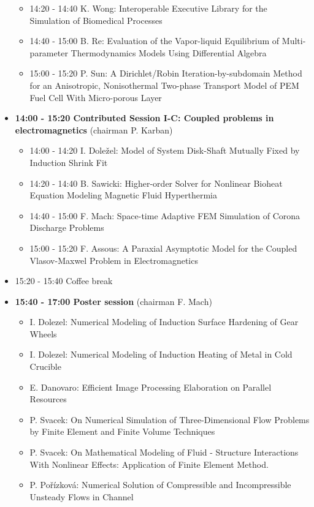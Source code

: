 \documentclass[10pt, A4]{article}%
\begin{document}
\begin{itemize}
\begin{itemize}
    \item 14:20 - 14:40 {K. Wong}: {Interoperable Executive Library for the Simulation of Biomedical Processes}
    \item 14:40 - 15:00 {B. Re}: {Evaluation of the Vapor-liquid Equilibrium of Multi-parameter Thermodynamics Models Using Differential Algebra}
    \item 15:00 - 15:20 {P. Sun}: A Dirichlet/Robin Iteration-by-subdomain Method for an Anisotropic, Nonisothermal Two-phase Transport Model of PEM Fuel Cell With Micro-porous Layer
  \end{itemize}
    \item {\bf 14:00 - 15:20 Contributed Session I-C: Coupled problems in electromagnetics} (chairman P. Karban) 
  \begin{itemize}
    \item 14:00 - 14:20 {I. Doležel}: {Model of System Disk-Shaft Mutually Fixed by Induction Shrink Fit}
    \item 14:20 - 14:40 {B. Sawicki}: {Higher-order Solver for Nonlinear Bioheat Equation Modeling Magnetic Fluid Hyperthermia}
    \item 14:40 - 15:00 {F. Mach}: {Space-time Adaptive FEM Simulation of Corona Discharge Problems}
    \item 15:00 - 15:20 {F. Assous}: {A Paraxial Asymptotic Model for the Coupled Vlasov-Maxwel Problem in Electromagnetics}  %
    \end{itemize}
  \item 15:20 - 15:40 Coffee break
  \newpage
  \item {\bf 15:40 - 17:00 Poster session} (chairman F. Mach)
  \begin{itemize}
    \item {I. Dolezel}: {Numerical Modeling of Induction Surface Hardening of Gear Wheels}
    \item {I. Dolezel}: {Numerical Modeling of Induction Heating of Metal in Cold Crucible}
    \item {E. Danovaro}: {Efficient Image Processing Elaboration on Parallel Resources}
	\item {P. Svacek}: {On Numerical Simulation of Three-Dimensional Flow Problems by Finite Element and Finite Volume Techniques}
	\item {P. Svacek}: {On Mathematical Modeling of Fluid - Structure Interactions With Nonlinear Effects: Application of Finite Element Method.}
    \item {P. Pořízková}: {Numerical Solution of Compressible and Incompressible Unsteady Flows in Channel}

\end{itemize}
\end{itemize}
\end{document}
